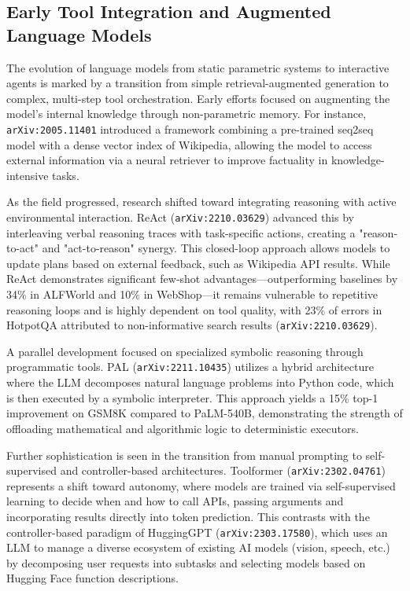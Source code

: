 \documentclass[11pt]{article}
\begin{document}
\subsection{Early Tool Integration and Augmented Language Models}

The evolution of language models from static parametric systems to interactive agents is marked by a transition from simple retrieval-augmented generation to complex, multi-step tool orchestration. Early efforts focused on augmenting the model's internal knowledge through non-parametric memory. For instance, \texttt{arXiv:2005.11401} introduced a framework combining a pre-trained seq2seq model with a dense vector index of Wikipedia, allowing the model to access external information via a neural retriever to improve factuality in knowledge-intensive tasks.

As the field progressed, research shifted toward integrating reasoning with active environmental interaction. ReAct (\texttt{arXiv:2210.03629}) advanced this by interleaving verbal reasoning traces with task-specific actions, creating a "reason-to-act" and "act-to-reason" synergy. This closed-loop approach allows models to update plans based on external feedback, such as Wikipedia API results. While ReAct demonstrates significant few-shot advantages—outperforming baselines by 34\% in ALFWorld and 10\% in WebShop—it remains vulnerable to repetitive reasoning loops and is highly dependent on tool quality, with 23\% of errors in HotpotQA attributed to non-informative search results (\texttt{arXiv:2210.03629}).

A parallel development focused on specialized symbolic reasoning through programmatic tools. PAL (\texttt{arXiv:2211.10435}) utilizes a hybrid architecture where the LLM decomposes natural language problems into Python code, which is then executed by a symbolic interpreter. This approach yields a 15\% top-1 improvement on GSM8K compared to PaLM-540B, demonstrating the strength of offloading mathematical and algorithmic logic to deterministic executors.

Further sophistication is seen in the transition from manual prompting to self-supervised and controller-based architectures. Toolformer (\texttt{arXiv:2302.04761}) represents a shift toward autonomy, where models are trained via self-supervised learning to decide when and how to call APIs, passing arguments and incorporating results directly into token prediction. This contrasts with the controller-based paradigm of HuggingGPT (\texttt{arXiv:2303.17580}), which uses an LLM to manage a diverse ecosystem of existing AI models (vision, speech, etc.) by decomposing user requests into subtasks and selecting models based on Hugging Face function descriptions.
\end{document}
